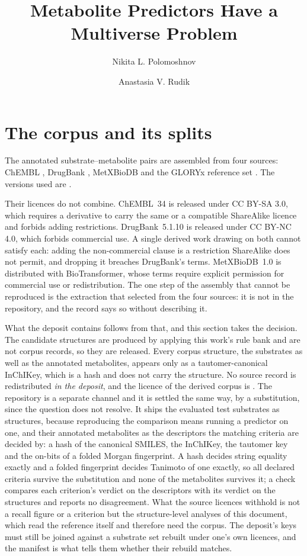 \documentclass[journal=jcisd8,manuscript=suppinfo,layout=onecolumn]{achemso}
\author{Nikita L. Polomoshnov}
\affiliation{Faculty of Bioengineering and Bioinformatics, Lomonosov Moscow State University,
Leninskie Gory 1-73, Moscow 119234, Russia}
\author{Anastasia V. Rudik}
\affiliation{Department of Bioinformatics, Institute of Biomedical Chemistry,
Pogodinskaya Str. 10-8, Moscow 119121, Russia}
\title{Metabolite Predictors Have a Multiverse Problem}
\begin{document}
\maketitle

\section{The corpus and its splits}
\label{sec:si-corpus}



The annotated substrate--metabolite pairs are assembled from four sources: ChEMBL
\citep{Zdrazil_2024}, DrugBank \citep{Wishart_2018}, MetXBioDB \citep{Djoumbou_Feunang_2019} and
the GLORYx reference set \citep{de_Bruyn_Kops_2020}. The versions used are \CorpusVersions{}.

Their licences do not combine. ChEMBL~34 is released under CC BY-SA 3.0, which requires a
derivative to carry the same or a compatible ShareAlike licence and forbids adding restrictions.
DrugBank~5.1.10 is released under CC BY-NC 4.0, which forbids commercial use. A single derived
work drawing on both cannot satisfy each: adding the non-commercial clause is a restriction
ShareAlike does not permit, and dropping it breaches DrugBank's terms. MetXBioDB~1.0 is
distributed with BioTransformer, whose terms require explicit permission for commercial use or
redistribution. The one step of the assembly that cannot be reproduced is the extraction
that selected from the four sources: it is not in the repository, and the record says so without
describing it.

What the deposit contains follows from that, and this section takes the decision.
The candidate structures are produced by applying this work's rule bank and are not corpus
records, so they are released. Every corpus structure, the substrates as well as the annotated
metabolites, appears only as a tautomer-canonical InChIKey, which is a hash and does not carry
the structure. No source record is redistributed \emph{in the deposit}, and the licence of the
derived corpus is \CorpusLicence{}. The repository is a separate channel and it is settled the same
way, by a substitution, since the question does not resolve. It ships the
evaluated test substrates as structures, because reproducing the comparison means running a
predictor on one, and their annotated metabolites as the descriptors the matching criteria are
decided by: a hash of the canonical SMILES, the InChIKey, the tautomer key and the on-bits of a
folded Morgan fingerprint. A hash decides string equality exactly and a folded fingerprint decides
Tanimoto of one exactly, so all \numCritCriteria{} declared criteria survive the substitution and
none of the metabolites survives it; a check compares each criterion's verdict on the descriptors
with its verdict on the structures and reports no disagreement. What the source licences withhold is
not a recall figure or a criterion but the structure-level
analyses of this document, which read the reference itself and therefore need the corpus.
The deposit's keys must still be joined against a substrate set rebuilt under one's own licences,
and the manifest is what tells them whether their rebuild matches.
\end{document}
